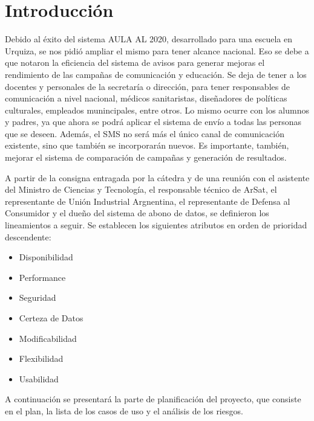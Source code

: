 \documentclass[a4paper, 11pt]{article}
\begin{document}
\pagestyle{myheadings}
\maketitle

\thispagestyle{empty}
\tableofcontents

\newpage

\section{Introducción}
Debido al éxito del sistema AULA AL 2020, desarrollado para una escuela en Urquiza, se nos pidió ampliar el mismo para tener alcance nacional. Eso se debe a que notaron la eficiencia del sistema de avisos para generar mejoras el rendimiento de las campañas de comunicación y educación. Se deja de tener a los docentes y personales de la secretaría o dirección, para tener responsables de comunicación a nivel nacional, médicos sanitaristas, diseñadores de políticas culturales, empleados munincipales, entre otros. Lo mismo ocurre con los alumnos y padres, ya que ahora se podrá aplicar el sistema de envío a todas las personas que se deseen. Además, el SMS no será más el único canal de comunicación existente, sino que también se incorporarán nuevos. Es importante, también, mejorar el sistema de comparación de campañas y generación de resultados. 

A partir de la consigna entragada por la cátedra y de una reunión con el asistente del Ministro de Ciencias y Tecnología, el responsable técnico de ArSat, el representante de Unión Industrial Argnentina, el representante de Defensa al Consumidor y el dueño del sistema de abono de datos, se definieron los lineamientos a seguir. Se establecen los siguientes atributos en orden de prioridad descendente: 
\begin{itemize}
\item Disponibilidad
\item Performance
\item Seguridad
\item Certeza de Datos
\item Modificabilidad
\item Flexibilidad
\item Usabilidad
\end{itemize}

A continuación se presentará la parte de planificación del proyecto, que consiste en el plan, la lista de los casos de uso y el análisis de los riesgos.  
\end{document}

